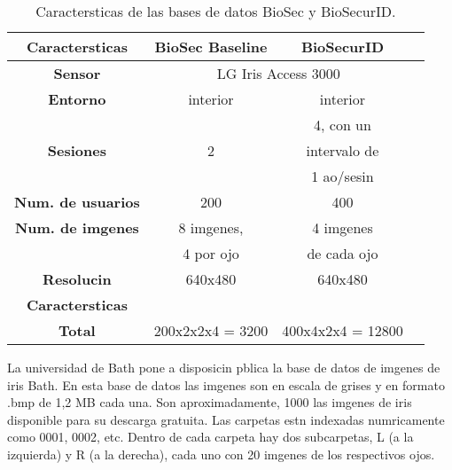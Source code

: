\vspace{1cm}

\begin{table}[h]
    \centering
    \scriptsize
    \begin{tabular}{|c|c|c|c|}
        \hline
        \textbf{Caractersticas}   & \textbf{BioSec Baseline}      &  \textbf{BioSecurID}       \\
        \hline
        \textbf{Sensor}            & \multicolumn{2}{|c|}{LG Iris Access 3000}\\
        \hline
        \textbf{Entorno}           & interior               & interior        \\
        \hline
                                   &                        & 4, con un                \\
        \textbf{Sesiones}          & 2                      & intervalo de               \\
                                   &                        & 1 ao/sesin           \\
        \hline
        \textbf{Num. de usuarios}  & 200                    & 400              \\
        \hline
        \textbf{Num. de imgenes}  & 8 imgenes,            & 4 imgenes  \\
                                   & 4 por ojo              & de cada ojo \\
        \hline
        \textbf{Resolucin}        & 640x480                & 640x480         \\
        \hline
        \textbf{Caractersticas}   &                        &                 \\
        \hline
        \textbf{Total}             & 200x2x2x4 = 3200       & 400x4x2x4 = 12800    \\
        \hline
    \end{tabular}
    \caption{Caractersticas de las bases de datos BioSec\citet{database:Biosec} y BioSecurID\citet{database:BiosecurID}.}
    \label{table:info_ATVS}
\end{table}

\newpage

 \label{sec:BATH_database}

La universidad de Bath pone a disposicin pblica la base de datos de imgenes de iris Bath. En esta base de datos las imgenes son en escala de grises y en formato .bmp de 1,2 MB cada una. Son aproximadamente, 1000 las imgenes de iris disponible para su descarga gratuita. Las carpetas estn indexadas numricamente como 0001, 0002, etc. Dentro de cada carpeta hay dos subcarpetas, L (a la izquierda) y R (a la derecha), cada uno con 20 imgenes de los respectivos ojos.

